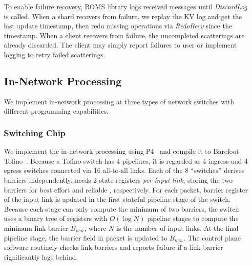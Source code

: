 To enable failure recovery, ROMS library logs received messages until \emph{DiscardLog} is called.
When a shard recovers from failure, we replay the KV log and get the last update timestamp, then redo missing operations via \emph{RedoRecv} since the timestamp.
When a client recovers from failure, the uncompleted scatterings are already discarded.
The client may simply report failures to user or implement logging to retry failed scatterings.
\fi


\subsection{In-Network Processing}
\label{sec:in-network-processing}

We implement in-network processing at three types of network switches with different programming capabilities.


\subsubsection{ Switching Chip}
\label{sec:p4}

We implement the in-network processing using P4~\cite{bosshart2014p4} and compile it to Barefoot Tofino~\cite{tofino}. Because a Tofino switch has 4 pipelines, it is regarded as 4 ingress and 4 egress switches connected via 16 all-to-all links. Each of the 8 ``switches'' derives barriers independently.
\sys{} needs 2 state registers \emph{per input link}, storing the two barriers for best effort and reliable \sys{}, respectively.
For each packet, barrier register of the input link is updated in the first stateful pipeline stage of the switch.
Because each stage can only compute the minimum of two barriers, the switch uses a binary tree of registers with $O(\log N)$ pipeline stages to compute the minimum link barrier $B_{new}$, where $N$ is the number of input links.
At the final pipeline stage, the barrier field in packet is updated to $B_{new}$.
The control plane software routinely checks link barriers and reports failure if a link barrier significantly lags behind.


